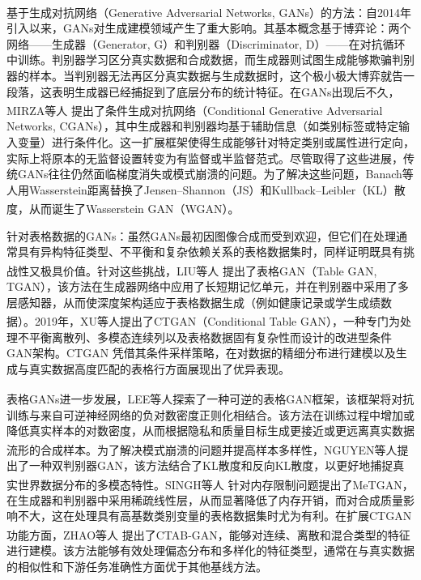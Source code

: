 基于生成对抗网络（Generative Adversarial Networks, GANs）\textsuperscript{\cite{goodfellow2014generative}}的方法：自2014年引入以来，GANs对生成建模领域产生了重大影响。其基本概念基于博弈论：两个网络——生成器（Generator, G）和判别器（Discriminator, D）——在对抗循环中训练。判别器学习区分真实数据和合成数据，而生成器则试图生成能够欺骗判别器的样本。当判别器无法再区分真实数据与生成数据时，这个极小极大博弈就告一段落，这表明生成器已经捕捉到了底层分布的统计特征。在GANs出现后不久，MIRZA等人\textsuperscript{\cite{mirza2014conditional}} 提出了条件生成对抗网络（Conditional Generative Adversarial Networks, CGANs），其中生成器和判别器均基于辅助信息（如类别标签或特定输入变量）进行条件化。这一扩展框架使得生成能够针对特定类别或属性进行定向，实际上将原本的无监督设置转变为有监督或半监督范式。尽管取得了这些进展，传统GANs往往仍然面临梯度消失或模式崩溃的问题。为了解决这些问题，Banach等人用Wasserstein距离替换了Jensen–Shannon（JS）和Kullback–Leibler（KL）散度，从而诞生了Wasserstein GAN（WGAN）\textsuperscript{\cite{adler2018banach,arjovsky2017towards}}。

针对表格数据的GANs：虽然GANs最初因图像合成而受到欢迎，但它们在处理通常具有异构特征类型、不平衡和复杂依赖关系的表格数据集时，同样证明既具有挑战性又极具价值。针对这些挑战，LIU等人\textsuperscript{\cite{xu2018synthesizing}} 提出了表格GAN（Table GAN, TGAN），该方法在生成器网络中应用了长短期记忆单元，并在判别器中采用了多层感知器，从而使深度架构适应于表格数据生成（例如健康记录或学生成绩数据）。2019年，XU等人\textsuperscript{\cite{xu2019modeling}}提出了CTGAN（Conditional Table GAN），一种专门为处理不平衡离散列、多模态连续列以及表格数据固有复杂性而设计的改进型条件GAN架构。CTGAN 凭借其条件采样策略，在对数据的精细分布进行建模以及生成与真实数据高度匹配的表格行方面展现出了优异表现。

表格GANs进一步发展，LEE等人\textsuperscript{\cite{lee2021invertible}}探索了一种可逆的表格GAN框架，该框架将对抗训练与来自可逆神经网络的负对数密度正则化相结合。该方法在训练过程中增加或降低真实样本的对数密度，从而根据隐私和质量目标生成更接近或更远离真实数据流形的合成样本。为了解决模式崩溃的问题并提高样本多样性，NGUYEN等人\textsuperscript{\cite{nguyen2017dual}}提出了一种双判别器GAN，该方法结合了KL散度和反向KL散度，以更好地捕捉真实世界数据分布的多模态特性。SINGH等人\textsuperscript{\cite{singh2021metgan}} 针对内存限制问题提出了MeTGAN，在生成器和判别器中采用稀疏线性层，从而显著降低了内存开销，而对合成质量影响不大，这在处理具有高基数类别变量的表格数据集时尤为有利。在扩展CTGAN功能方面，ZHAO等人\textsuperscript{\cite{zhao2021ctab}} 提出了CTAB-GAN，能够对连续、离散和混合类型的特征进行建模。该方法能够有效处理偏态分布和多样化的特征类型，通常在与真实数据的相似性和下游任务准确性方面优于其他基线方法。%

